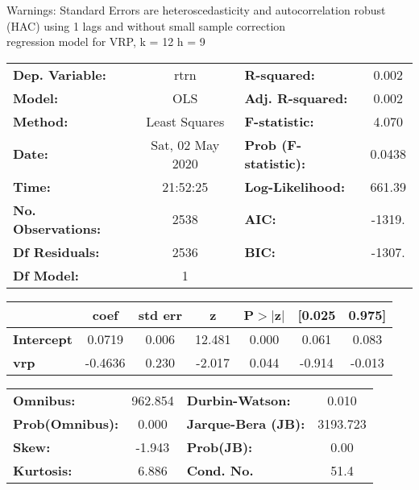 Warnings: \newline
 [1] Standard Errors are heteroscedasticity and autocorrelation robust (HAC) using 1 lags and without small sample correction\\ 

regression model for VRP, k = 12 h = 9\begin{center}
\begin{tabular}{lclc}
\toprule
\textbf{Dep. Variable:}    &       rtrn       & \textbf{  R-squared:         } &     0.002   \\
\textbf{Model:}            &       OLS        & \textbf{  Adj. R-squared:    } &     0.002   \\
\textbf{Method:}           &  Least Squares   & \textbf{  F-statistic:       } &     4.070   \\
\textbf{Date:}             & Sat, 02 May 2020 & \textbf{  Prob (F-statistic):} &   0.0438    \\
\textbf{Time:}             &     21:52:25     & \textbf{  Log-Likelihood:    } &    661.39   \\
\textbf{No. Observations:} &        2538      & \textbf{  AIC:               } &    -1319.   \\
\textbf{Df Residuals:}     &        2536      & \textbf{  BIC:               } &    -1307.   \\
\textbf{Df Model:}         &           1      & \textbf{                     } &             \\
\bottomrule
\end{tabular}
\begin{tabular}{lcccccc}
                   & \textbf{coef} & \textbf{std err} & \textbf{z} & \textbf{P$> |$z$|$} & \textbf{[0.025} & \textbf{0.975]}  \\
\midrule
\textbf{Intercept} &       0.0719  &        0.006     &    12.481  &         0.000        &        0.061    &        0.083     \\
\textbf{vrp}       &      -0.4636  &        0.230     &    -2.017  &         0.044        &       -0.914    &       -0.013     \\
\bottomrule
\end{tabular}
\begin{tabular}{lclc}
\textbf{Omnibus:}       & 962.854 & \textbf{  Durbin-Watson:     } &    0.010  \\
\textbf{Prob(Omnibus):} &   0.000 & \textbf{  Jarque-Bera (JB):  } & 3193.723  \\
\textbf{Skew:}          &  -1.943 & \textbf{  Prob(JB):          } &     0.00  \\
\textbf{Kurtosis:}      &   6.886 & \textbf{  Cond. No.          } &     51.4  \\
\bottomrule
\end{tabular}
\end{center}

